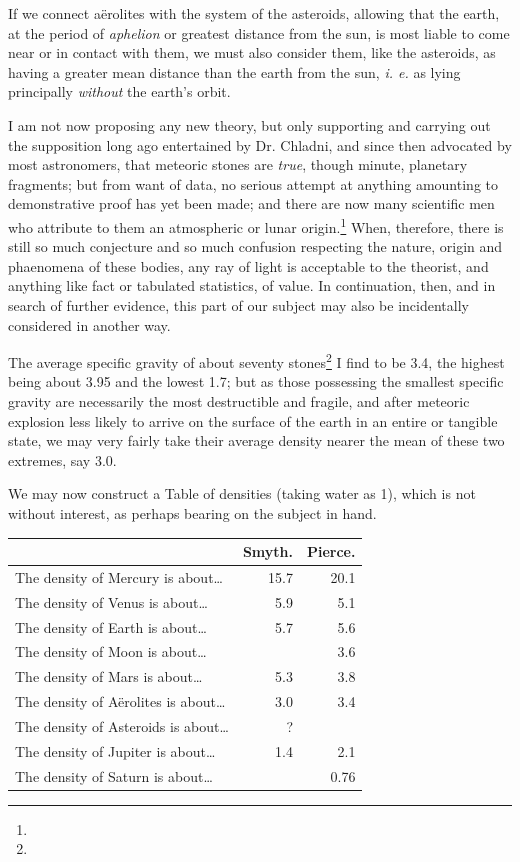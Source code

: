 \documentclass[a4paper, 12pt, oneside]{article}
\begin{document}
If we connect aërolites with the system of the asteroids, allowing that the earth, at the period of \emph{aphelion} or greatest distance from the sun, is most liable to come near or in contact with them, we must also consider them, like the asteroids, as having a greater mean distance than the earth from the sun, \emph{i. e.} as lying principally \emph{without} the earth's orbit.

I am not now proposing any new theory, but only supporting and carrying out the supposition long ago entertained by Dr. Chladni, and since then advocated by most astronomers, that meteoric stones are \emph{true}, though minute, planetary fragments; but from want of data, no serious attempt at anything amounting to demonstrative proof has yet been made; and there are now many scientific men who attribute to them an atmospheric or lunar origin.\footnote{} When, therefore, there is still so much conjecture and so much confusion respecting the nature, origin and phaenomena of these bodies, any ray of light is acceptable to the theorist, and anything like fact or tabulated statistics, of value. In continuation, then, and in search of further evidence, this part of our subject may also be incidentally considered in another way.

The average specific gravity of about seventy stones\footnote{} I find to be 3.4, the highest being about 3.95 and the lowest 1.7; but as those possessing the smallest specific gravity are necessarily the most destructible and fragile, and after meteoric explosion less likely to arrive on the surface of the earth in an entire or tangible state, we may very fairly take their average density nearer the mean of these two extremes, say 3.0.

We may now construct a Table of densities (taking water as 1), which is not without interest, as perhaps bearing on the subject in hand.
\begin{table}[H]
    \centering
    \bfseries
    \Fontauri
    \begin{tabular}{l r r}
    \hline
         ~ & Smyth. & Pierce. \\ \hline
        The density of Mercury is about… & 15.7 & 20.1 \\ \hline
        The density of Venus is about… & 5.9 & 5.1 \\ \hline
        The density of Earth is about… & 5.7 & 5.6 \\ \hline
        The density of Moon is about… & ~ & 3.6 \\ \hline
        The density of Mars is about… & 5.3 & 3.8 \\ \hline
        The density of Aërolites is about… & 3.0 & 3.4 \\ \hline
        The density of Asteroids is about… & ? & ~ \\ \hline
        The density of Jupiter is about… & 1.4 & 2.1 \\ \hline
        The density of Saturn is about… & ~ & 0.76 \\ \hline
    \end{tabular}
\end{table}     
\end{document}
